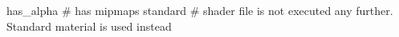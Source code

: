 has_alpha
# has mipmaps
standard     # shader file is not executed any further. Standard material is used instead
